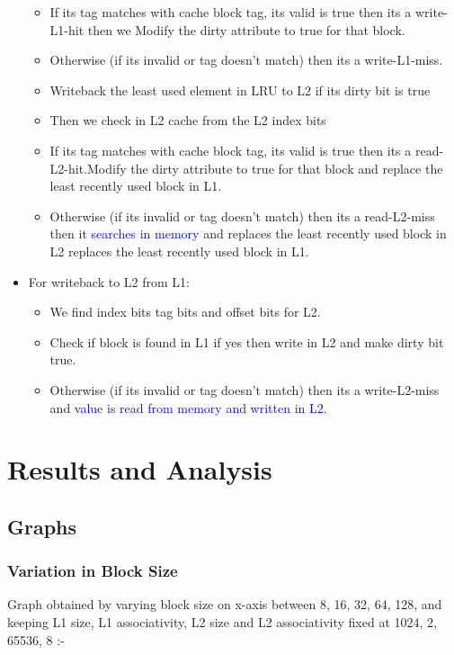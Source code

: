 \documentclass{article}
\begin{document}
\begin{itemize}
\begin{itemize}
        \item If its tag matches with cache block tag, its valid is true then its a write-L1-hit then we Modify the dirty attribute to true for that block.
        \item Otherwise (if its invalid or tag doesn't match) then its a write-L1-miss.
        \item Writeback the least used element in LRU to L2 if its dirty bit is true
        \item Then we check in L2 cache from the L2 index bits
        \item If its tag matches with cache block tag, its valid is true then its a read-L2-hit.Modify the dirty attribute to true for that block and replace the least recently used block in L1. 
        \item Otherwise (if its invalid or tag doesn't match) then its a read-L2-miss then it \textcolor{blue}{searches in memory} and replaces the least recently used block in L2 replaces the least recently used block in L1. 
    \end{itemize}
    \item For writeback to L2 from L1:
    \begin{itemize}
        \item We find index bits tag bits  and offset bits for L2.
        \item Check if block is found in L1 if yes then write in L2 and make dirty bit true.
        \item Otherwise (if its invalid or tag doesn't match) then its a write-L2-miss and \textcolor{blue}{value is read from memory and written in L2.}
    \end{itemize}
\end{itemize}


\newpage
\section{Results and Analysis}

\subsection{Graphs}


\subsubsection{Variation in Block Size}
Graph obtained by varying block size on x-axis between 8, 16, 32, 64, 128, and keeping L1 size,
L1 associativity, L2 size and L2 associativity fixed at 1024, 2, 65536, 8 :-
\end{document}
